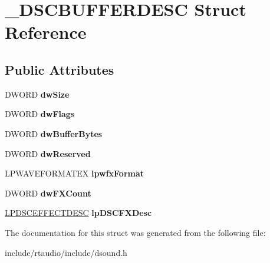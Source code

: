 \hypertarget{struct___d_s_c_b_u_f_f_e_r_d_e_s_c}{}\section{\+\_\+\+D\+S\+C\+B\+U\+F\+F\+E\+R\+D\+E\+SC Struct Reference}
\label{struct___d_s_c_b_u_f_f_e_r_d_e_s_c}
\subsection*{Public Attributes}
\begin{DoxyCompactItemize}
\item 
D\+W\+O\+RD {\bfseries dw\+Size}\hypertarget{struct___d_s_c_b_u_f_f_e_r_d_e_s_c_ae257294217c46127eec37cd198bad923}{}\label{struct___d_s_c_b_u_f_f_e_r_d_e_s_c_ae257294217c46127eec37cd198bad923}

\item 
D\+W\+O\+RD {\bfseries dw\+Flags}\hypertarget{struct___d_s_c_b_u_f_f_e_r_d_e_s_c_aeac514001b797bb0744660e254d621eb}{}\label{struct___d_s_c_b_u_f_f_e_r_d_e_s_c_aeac514001b797bb0744660e254d621eb}

\item 
D\+W\+O\+RD {\bfseries dw\+Buffer\+Bytes}\hypertarget{struct___d_s_c_b_u_f_f_e_r_d_e_s_c_a82d69f6f4cfb534c50bd4cfc7e2448a8}{}\label{struct___d_s_c_b_u_f_f_e_r_d_e_s_c_a82d69f6f4cfb534c50bd4cfc7e2448a8}

\item 
D\+W\+O\+RD {\bfseries dw\+Reserved}\hypertarget{struct___d_s_c_b_u_f_f_e_r_d_e_s_c_ac4b51280006b2bcf3f5b43aa72067ab8}{}\label{struct___d_s_c_b_u_f_f_e_r_d_e_s_c_ac4b51280006b2bcf3f5b43aa72067ab8}

\item 
L\+P\+W\+A\+V\+E\+F\+O\+R\+M\+A\+T\+EX {\bfseries lpwfx\+Format}\hypertarget{struct___d_s_c_b_u_f_f_e_r_d_e_s_c_aab38ebfa56e1d436a06fbdf4b9641505}{}\label{struct___d_s_c_b_u_f_f_e_r_d_e_s_c_aab38ebfa56e1d436a06fbdf4b9641505}

\item 
D\+W\+O\+RD {\bfseries dw\+F\+X\+Count}\hypertarget{struct___d_s_c_b_u_f_f_e_r_d_e_s_c_ab31dec03217fd023989c8131101039d6}{}\label{struct___d_s_c_b_u_f_f_e_r_d_e_s_c_ab31dec03217fd023989c8131101039d6}

\item 
\hyperlink{struct___d_s_c_e_f_f_e_c_t_d_e_s_c}{L\+P\+D\+S\+C\+E\+F\+F\+E\+C\+T\+D\+E\+SC} {\bfseries lp\+D\+S\+C\+F\+X\+Desc}\hypertarget{struct___d_s_c_b_u_f_f_e_r_d_e_s_c_a2a70bfa0614a82c0a26c70b29cf1442d}{}\label{struct___d_s_c_b_u_f_f_e_r_d_e_s_c_a2a70bfa0614a82c0a26c70b29cf1442d}

\end{DoxyCompactItemize}


The documentation for this struct was generated from the following file\+:\begin{DoxyCompactItemize}
\item 
include/rtaudio/include/dsound.\+h\end{DoxyCompactItemize}

